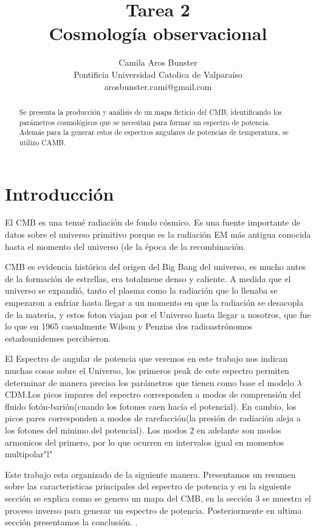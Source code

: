 \documentclass[a4paper]{article}
\title{Tarea 2 \\
Cosmología observacional}
\author{Camila Aros Bunster\\
  \small Pontificia Universidad Catolica de Valparaíso\\
  \small arosbunster.cami@gmail.com\\
  \date{}
}
\begin{document}
\maketitle

\begin{abstract}
Se presenta la producción y análisis de un mapa ficticio del CMB, identificando los parámetros cosmológicos que se necesitan para formar un espectro de potencia. Además para la generar estos de espectros angulares de potencias de temperatura, se utilizo  CAMB.
\end{abstract}

\section{\label{sec:introduccion}Introducción}

 El CMB es una tenué radiación de fondo cósmico. Es una fuente importante de datos sobre el universo primitivo porque es la radiación EM más antigua conocida hasta el momento del universo (de la época de la recombinación.
 

CMB es evidencia histórica del origen del Big Bang del universo, es mucho antes de la formación de estrellas, era totalmene denso y caliente. A medida que el universo se expandió, tanto el plasma como la radiación que lo llenaba se empezaron a  enfriar hasta llegar a un momento en que la radiación se desacopla de la materia, y estos foton viajan por el Universo hasta llegar a nosotros, que fue lo que en 1965 casualmente Wilson y Penzias dos radioastrónomos estadounidenses percibieron.

El Espectro de angular de potencia que veremos en este trabajo nos indican muchas cosas sobre el Universo, los primeros peak de este espectro permiten determinar de manera precisa los parámetros que tienen como base el modelo $\lambda$CDM.Los picos impares del espectro corresponden a modos de comprensión del fluido fotón-barión(cuando los fotones caen hacía el potencial). 
En cambio, los picos pares corresponden a modos de rarefacción(la presión de radiación aleja a los fotones del minimo del potencial). Los modos 2 en adelante son modos armonicos del primero, por lo que ocurren en intervalos igual en momentos multipolar"l"

Este trabajo esta organizado de la siguiente manera. Presentamos un resumen sobre las caracteristicas principales del espectro de potencia y en la siguiente sección se explica como se genero un mapa del CMB, en la sección 3 se muestra el proceso inverso para generar un espectro de potencia. Posteriormente en ultima sección presentamos la  conclusión.
.
\end{document}
